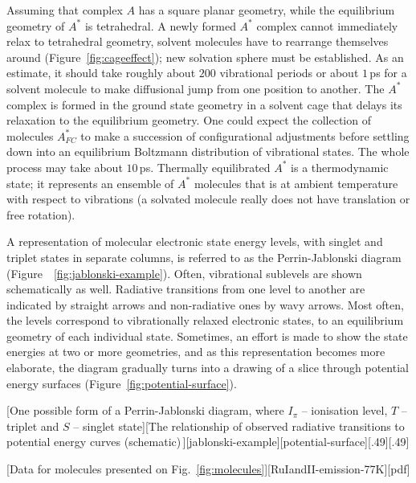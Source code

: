 Assuming that complex $A$ has a square planar geometry, while the equilibrium geometry of $ A^*$ is tetrahedral. A newly formed $A^*$ complex cannot immediately relax to tetrahedral geometry, solvent molecules have to rearrange themselves around (Figure~\ref{fig:cageeffect}); new solvation sphere must be established. As an estimate, it should take roughly about $200$ vibrational periods or about $1$\,ps for a solvent molecule to make diffusional jump from one position to another. The $A^*$ complex is formed in the ground state geometry in a solvent cage that delays its relaxation to the equilibrium geometry. One could expect the collection of molecules $ A^*_{FC}$ to make a succession of configurational adjustments before settling down into an equilibrium Boltzmann distribution of vibrational states. The whole process may take about $10$\,ps. Thermally equilibrated $A^*$ is a thermodynamic state; it represents an ensemble of $A^*$ molecules that is at ambient temperature with respect to vibrations (a solvated molecule really does not have translation or free rotation).\cite{adamson-1983}\par

A representation of molecular electronic state energy levels, with singlet and triplet states in separate columns, is referred to as the Perrin-Jablonski diagram (Figure~~\ref{fig:jablonski-example}). Often, vibrational sublevels are shown schematically as well. Radiative transitions from one level to another are indicated by straight arrows and non-radiative ones by wavy arrows. Most often, the levels correspond to vibrationally relaxed electronic states, \ie to an equilibrium geometry of each individual state. Sometimes, an effort is made to show the state energies at two or more geometries, and as this representation becomes more elaborate, the diagram gradually turns into a drawing of a slice through potential energy surfaces (Figure~\ref{fig:potential-surface}).

[One possible form of a Perrin-Jablonski diagram, where $I_\pi$ -- ionisation level, $T$ -- triplet and $S$ -- singlet state][The relationship of observed radiative transitions to potential energy curves (schematic)\,\cite{montalti-book-2006}][jablonski-example][potential-surface][.49][.49]


\label{sec:2ch-data}
[Data for molecules presented on Fig.~\ref{fig:molecules}][RuIandII-emission-77K][pdf]

